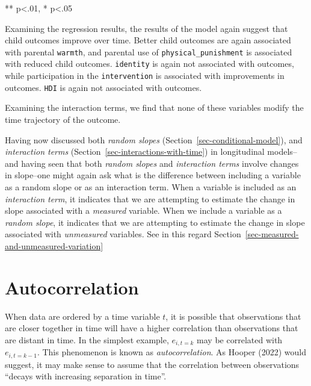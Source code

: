 \documentclass[
  letterpaper,
  DIV=11,
  numbers=noendperiod]{scrreprt}
\begin{document}
** p\textless.01, * p\textless.05

Examining the regression results, the results of the model again suggest
that child outcomes improve over time. Better child outcomes are again
associated with parental \texttt{warmth}, and parental use of
\texttt{physical\_punishment} is associated with reduced child outcomes.
\texttt{identity} is again not associated with outcomes, while
participation in the \texttt{intervention} is associated with
improvements in outcomes. \texttt{HDI} is again not associated with
outcomes.

Examining the interaction terms, we find that none of these variables
modify the time trajectory of the outcome.

\begin{tcolorbox}[enhanced jigsaw, opacityback=0, coltitle=black, rightrule=.15mm, toprule=.15mm, bottomtitle=1mm, bottomrule=.15mm, breakable, colframe=quarto-callout-tip-color-frame, titlerule=0mm, opacitybacktitle=0.6, leftrule=.75mm, left=2mm, colback=white, toptitle=1mm, colbacktitle=quarto-callout-tip-color!10!white, title=\textcolor{quarto-callout-tip-color}{\faLightbulb}\hspace{0.5em}{Interactions And Random Slopes in Longitudinal Models}, arc=.35mm]

Having now discussed both \emph{random slopes}
(Section~\ref{sec-conditional-model}), and \emph{interaction terms}
(Section~\ref{sec-interactions-with-time}) in longitudinal models--and
having seen that both \emph{random slopes} and \emph{interaction terms}
involve changes in slope--one might again ask what is the difference
between including a variable as a random slope or as an interaction
term. When a variable is included as an \emph{interaction term}, it
indicates that we are attempting to estimate the change in slope
associated with a \emph{measured} variable. When we include a variable
as a \emph{random slope}, it indicates that we are attempting to
estimate the change in slope associated with \emph{unmeasured}
variables. See in this regard
Section~\ref{sec-measured-and-unmeasured-variation}

\end{tcolorbox}

\section{Autocorrelation}\label{autocorrelation}

When data are ordered by a time variable \(t\), it is possible that
observations that are closer together in time will have a higher
correlation than observations that are distant in time. In the simplest
example, \(e_{i, t=k}\) may be correlated with \(e_{i, t=k-1}\). This
phenomenon is known as \emph{autocorrelation}. As Hooper (2022) would
suggest, it may make sense to assume that the correlation between
observations ``decays with increasing separation in time''.
\end{document}
